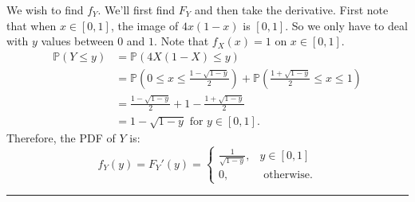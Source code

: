 \documentclass{article}
\theoremstyle{break}
\newenvironment{solution}{{\bf Solution:}}{\hfill\rule{2mm}{2mm}}
\newcommand{\R}{\mathbb{R}}
\renewcommand{\P}{\mathbb{P}}
\begin{document}
\begin{solution}
We wish to find $f_Y$. We'll first find $F_Y$ and then take the derivative. First note that when $x \in [0,1]$, the image of $4x(1-x)$ is $[0,1]$. So we only have to deal with $y$ values between $0$ and $1$. Note that $f_X(x) = 1$ on $x \in [0,1]$. 
\begin{align*}
\P(Y \leq y) &= \P(4X(1-X) \leq y) \\
	&= \P \left( 0 \leq x \leq \frac{1 - \sqrt{1-y}}{2} \right) + \P \left(\frac{1 + \sqrt{1-y}}{2} \leq x \leq 1 \right) \\
	&= \frac{1 - \sqrt{1-y}}{2} + 1 - \frac{1 + \sqrt{1-y}}{2} \\
	&= 1 - \sqrt{1-y} \text{ for } y \in [0,1].
\end{align*}
Therefore, the PDF of $Y$ is:
\[ f_Y(y) = F_Y'(y) = \begin{cases}
\frac{1}{\sqrt{1-y}}, & y \in [0,1] \\
0, & \text{ otherwise}.
\end{cases} 
\]


\begin{comment}
Let $X$ be uniformly distributed on $[0,1]$, let $g(x) = 4x(1-x)$, and let $Y = g(X)$. Since $X$ is continuous, $g(x)$ is continuous, and assuming $F_Y$ is differentiable, we can again use Proposition 2.6 from the notes. 

Since $X$ is uniformly distributed on $[0,1]$, $f_X = 1$ for $x \in [0,1]$ and $f_X = 0$ otherwise. Then \begin{align*}
F_Y(y) &= \frac{d}{dy} \int_{\{x \in \R : g(x) \leq y\}} f_X(x)dx \\
&= \frac{d}{dy} \int_{\{x \in [0,1]: 4x(1-x) \leq y \}} 1  dx.
\end{align*}
If $y < 0$, the integral is zero. If $y > 1$, the integral is 1. If $y \in [0, 1]$, we have
\begin{align*}
f_Y(y) &= \frac{d}{dy} \int_{\{x \in [0,1]: 4x(1-x) \leq y \}} 1  dx \\
	&= \frac{d}{dy} \left[ 1 -  \int_{\{x \in [0,1]: 4x(1-x) > y \}} 1 dx \right] \\
	&= \frac{d}{dy} \left[ 1 -  \int_{\{x \in [0,1]: 4x(1-x) > y \}} 1 dx \right] 
\end{align*}
\end{comment}





\end{solution}
\end{document}
